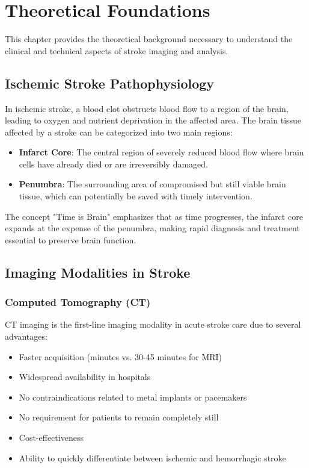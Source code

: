 
\chapter{Theoretical Foundations}\label{chapter:theoretical_foundations}

This chapter provides the theoretical background necessary to understand the clinical and technical aspects of stroke imaging and analysis.

\section{Ischemic Stroke Pathophysiology}

In ischemic stroke, a blood clot obstructs blood flow to a region of the brain, leading to oxygen and nutrient deprivation in the affected area. The brain tissue affected by a stroke can be categorized into two main regions:

\begin{itemize}
    \item \textbf{Infarct Core}: The central region of severely reduced blood flow where brain cells have already died or are irreversibly damaged.
    
    \item \textbf{Penumbra}: The surrounding area of compromised but still viable brain tissue, which can potentially be saved with timely intervention.
\end{itemize}

The concept "Time is Brain" emphasizes that as time progresses, the infarct core expands at the expense of the penumbra, making rapid diagnosis and treatment essential to preserve brain function.

\section{Imaging Modalities in Stroke}

\subsection{Computed Tomography (CT)}

CT imaging is the first-line imaging modality in acute stroke care due to several advantages:

\begin{itemize}
    \item Faster acquisition (minutes vs. 30-45 minutes for MRI)
    \item Widespread availability in hospitals
    \item No contraindications related to metal implants or pacemakers
    \item No requirement for patients to remain completely still
    \item Cost-effectiveness
    \item Ability to quickly differentiate between ischemic and hemorrhagic stroke
\end{itemize}

